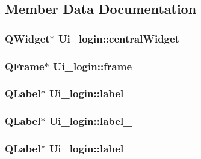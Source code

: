 \subsection{Member Data Documentation}
\hypertarget{classUi__login_a305d3342033a2a8a4ae198dd877fc32b}{
\subsubsection[{central\-Widget}]{\setlength{\rightskip}{0pt plus 5cm}Q\-Widget$\ast$ Ui\-\_\-login\-::central\-Widget}}\label{classUi__login_a305d3342033a2a8a4ae198dd877fc32b}
\hypertarget{classUi__login_adde4eaecbf3f162fe45feb193899fbc8}{
\subsubsection[{frame}]{\setlength{\rightskip}{0pt plus 5cm}Q\-Frame$\ast$ Ui\-\_\-login\-::frame}}\label{classUi__login_adde4eaecbf3f162fe45feb193899fbc8}
\hypertarget{classUi__login_a4c0d02992de5f164908ec9c0212fce9e}{
\subsubsection[{label}]{\setlength{\rightskip}{0pt plus 5cm}Q\-Label$\ast$ Ui\-\_\-login\-::label}}\label{classUi__login_a4c0d02992de5f164908ec9c0212fce9e}
\hypertarget{classUi__login_aafa8b63c8fb67dbe235558b4eb0a4d1b}{
\subsubsection[{label\-\_\-2}]{\setlength{\rightskip}{0pt plus 5cm}Q\-Label$\ast$ Ui\-\_\-login\-::label\-\_}}\label{classUi__login_aafa8b63c8fb67dbe235558b4eb0a4d1b}
\hypertarget{classUi__login_a9dd6304aaa11bf305644656b13163538}{
\subsubsection[{label\-\_\-3}]{\setlength{\rightskip}{0pt plus 5cm}Q\-Label$\ast$ Ui\-\_\-login\-::label\-\_}}\label{classUi__login_a9dd6304aaa11bf305644656b13163538}
